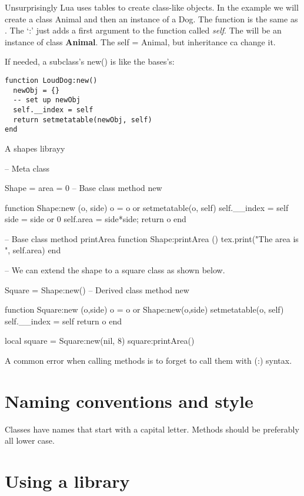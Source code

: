 Unsurprisingly Lua uses tables to create class-like objects. In the example we will create a class Animal and then an instance of a Dog. The function  is the same as . The ‘:’ just adds a first argument to the function called \textit{self}.  The  will be an instance of class \textbf{Animal}. The self = Animal, but inheritance ca change it. 


If needed, a subclass's new() is like the bases's:

\begin{verbatim}
function LoudDog:new()
  newObj = {}
  -- set up newObj
  self.__index = self
  return setmetatable(newObj, self)
end
\end{verbatim}

\begin{texexample}{A shapes librayy}{}
\begin{luacode}
-- Meta class

Shape = {area = 0}
-- Base class method new

function Shape:new (o, side)
  o = o or {}
  setmetatable(o, self)
  self.__index = self
  side = side or 0
  self.area = side*side;
  return o
end

-- Base class method printArea
function Shape:printArea ()
  tex.print("The area is ", self.area)
end

-- We can extend the shape to a square class as shown below.

Square = Shape:new()
-- Derived class method new

function Square:new (o,side)
  o = o or Shape:new(o,side)
  setmetatable(o, self)
  self.__index = self
  return o
end

local square = Square:new(nil, 8)
square:printArea()
\end{luacode}
\end{texexample}

A common error when calling  methods is to forget to call them with (:) syntax. 

\section{Naming conventions and style}

Classes have names that start with a capital letter. Methods should be preferably all lower case. 

\section{Using a library}

